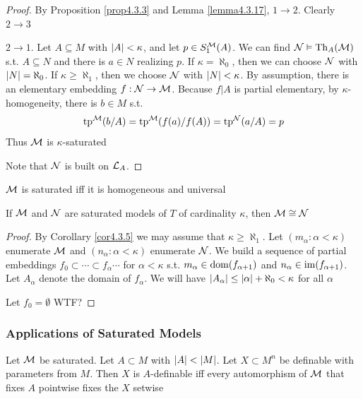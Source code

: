 \documentclass[11pt]{article}
\begin{document}
\begin{proof}
By Proposition \ref{prop4.3.3} and Lemma \ref{lemma4.3.17}, \(1\to 2\). Clearly \(2\to 3\)

\(2\to 1\). Let \(A\subseteq M\) with \(\abs{A}<\kappa\), and let \(p\in S_1^{\mathcal{M}}(A)\). We can find \(\mathcal{N}\vDash\operatorname{Th}_A(\mathcal{M})\)
s.t. \(A\subseteq N\) and there is \(a\in N\) realizing \(p\). If \(\kappa=\aleph_0\), then we can choose \(\mathcal{N}\)
with \(\abs{N}=\aleph_0\). If \(\kappa\ge\aleph_1\), then we choose \(\mathcal{N}\) with \(\abs{N}<\kappa\). By assumption, there
is an elementary embedding \(f:\mathcal{N}\to\mathcal{M}\). Because \(f|A\) is partial elementary, by \(\kappa\)-homogeneity,
there is \(b\in M\) s.t.
\begin{equation*}
\operatorname{tp}^{\mathcal{M}}(b/A)=\operatorname{tp}^{\mathcal{M}}(f(a)/f(A))=\operatorname{tp}^{\mathcal{N}}(a/A)=p
\end{equation*}
Thus \(\mathcal{M}\) is \(\kappa\)-saturated

Note that \(\mathcal{N}\) is built on \(\mathcal{L}_A\).
\end{proof}

\begin{corollary}[]
\(\mathcal{M}\) is saturated iff it is homogeneous and universal
\end{corollary}

\begin{theorem}[]
If \(\mathcal{M}\) and \(\mathcal{N}\) are saturated models of \(T\) of cardinality \(\kappa\), then \(\mathcal{M}\cong\mathcal{N}\)
\end{theorem}

\begin{proof}
By Corollary \ref{cor4.3.5} we may assume that \(\kappa\ge\aleph_1\). Let \((m_\alpha:\alpha<\kappa)\) enumerate \(\mathcal{M}\)
and \((n_\alpha:\alpha<\kappa)\) enumerate \(\mathcal{N}\). We build a sequence of partial embeddings \(f_0\subset\cdots\subset f_\alpha\cdots\)
for \(\alpha<\kappa\) s.t. \(m_\alpha\in\operatorname{dom}(f_{\alpha+1})\) and \(n_\alpha\in\operatorname{im}(f_{\alpha+1})\). Let \(A_\alpha\) denote the domain
of \(f_\alpha\). We will have \(\abs{A_\alpha}\le\abs{\alpha}+\aleph_0<\kappa\) for all \(\alpha\)

Let \(f_0=\emptyset\) \label{Problem7} WTF?
\end{proof}

\subsubsection{Applications of Saturated Models}
\label{sec:org2159c9b}

\begin{proposition}[]
\label{prop4.3.25}
Let \(\mathcal{M}\) be saturated. Let \(A\subset M\) with \(\abs{A}<\abs{M}\). Let \(X\subset M^n\) be definable with
parameters from \(M\). Then \(X\) is \(A\)-definable iff every automorphism of \(\mathcal{M}\) that
fixes \(A\) pointwise fixes the \(X\) setwise
\end{proposition}
\end{document}
